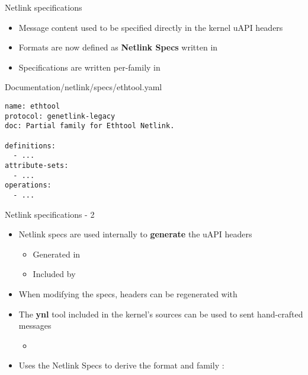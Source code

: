 \begin{frame}[fragile]{Netlink specifications}
	\begin{itemize}
		\item Message content used to be specified directly in the kernel uAPI headers
		\item Formats are now defined as \textbf{Netlink Specs} written in 
		\item Specifications are written per-family in 
	\end{itemize}
	\begin{block}{Documentation/netlink/specs/ethtool.yaml}
	\begin{verbatim}
name: ethtool
protocol: genetlink-legacy
doc: Partial family for Ethtool Netlink.

definitions:
  - ...
attribute-sets:
  - ...
operations:
  - ...
	\end{verbatim}
	\end{block}
\end{frame}

\begin{frame}{Netlink specifications - 2}
	\begin{itemize}
		\item Netlink specs are used internally to \textbf{generate} the uAPI headers
			\begin{itemize}
				\item Generated in 
				\item Included by 
			\end{itemize}
		\item When modifying the specs, headers can be regenerated with 
		\item The \textbf{ynl} tool included in the kernel's sources can be used to sent hand-crafted messages
			\begin{itemize}
				\item {}
			\end{itemize}
		\item Uses the Netlink Specs to derive the format and family :
	\end{itemize}
\end{frame}


